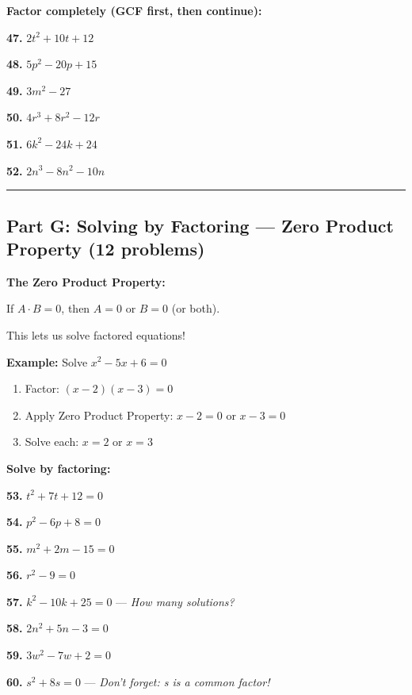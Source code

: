 \documentclass[
  11pt,
]{article}
\providecommand{\tightlist}{%
  \setlength{\itemsep}{0pt}\setlength{\parskip}{0pt}}
\begin{document}
\textbf{Factor completely (GCF first, then continue):}

\textbf{47.} \(2t^2 + 10t + 12\)

\textbf{48.} \(5p^2 - 20p + 15\)

\textbf{49.} \(3m^2 - 27\)

\textbf{50.} \(4r^3 + 8r^2 - 12r\)

\textbf{51.} \(6k^2 - 24k + 24\)

\textbf{52.} \(2n^3 - 8n^2 - 10n\)

\begin{center}\rule{0.5\linewidth}{0.5pt}\end{center}

\hypertarget{part-g-solving-by-factoring-zero-product-property-12-problems}{%
\subsection{Part G: Solving by Factoring --- Zero Product Property (12
problems)}\label{part-g-solving-by-factoring-zero-product-property-12-problems}}

\textbf{The Zero Product Property:}

If \(A \cdot B = 0\), then \(A = 0\) or \(B = 0\) (or both).

This lets us solve factored equations!

\textbf{Example:} Solve \(x^2 - 5x + 6 = 0\)

\begin{enumerate}
\def\labelenumi{\arabic{enumi}.}
\tightlist
\item
  Factor: \((x - 2)(x - 3) = 0\)
\item
  Apply Zero Product Property: \(x - 2 = 0\) or \(x - 3 = 0\)
\item
  Solve each: \(x = 2\) or \(x = 3\)
\end{enumerate}

\textbf{Solve by factoring:}

\textbf{53.} \(t^2 + 7t + 12 = 0\)

\textbf{54.} \(p^2 - 6p + 8 = 0\)

\textbf{55.} \(m^2 + 2m - 15 = 0\)

\textbf{56.} \(r^2 - 9 = 0\)

\textbf{57.} \(k^2 - 10k + 25 = 0\) --- \emph{How many solutions?}

\textbf{58.} \(2n^2 + 5n - 3 = 0\)

\textbf{59.} \(3w^2 - 7w + 2 = 0\)

\textbf{60.} \(s^2 + 8s = 0\) --- \emph{Don't forget: s is a common
factor!}
\end{document}
